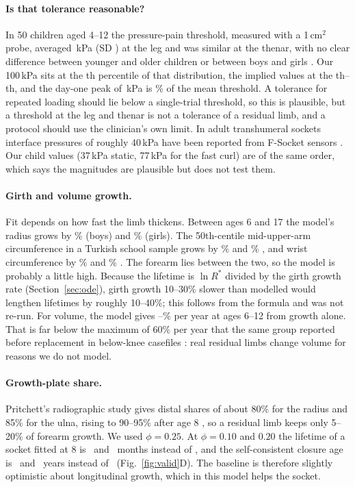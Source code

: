 \documentclass[11pt]{article}
\begin{document}
\paragraph{Is that tolerance reasonable?} In 50 children aged 4--12 the pressure-pain threshold, measured with a 1\,cm$^2$ probe, averaged \pptMean\,kPa (SD \pptSd) at the leg and was similar at the thenar, with no clear difference between younger and older children or between boys and girls \citep{nikolajsen2011}. Our 100\,kPa sits at the \tolPct th percentile of that distribution, the implied values at the \impPctCyl th--\impPctTap th, and the day-one peak of \pZeroEight\,kPa is \dayOnePPT\% of the mean threshold. A tolerance for repeated loading should lie below a single-trial threshold, so this is plausible, but a threshold at the leg and thenar is not a tolerance of a residual limb, and a protocol should use the clinician's own limit. In adult transhumeral sockets interface pressures of roughly 40\,kPa have been reported from F-Socket sensors \citep{razak2014}. Our child values (37\,kPa static, 77\,kPa for the fast curl) are of the same order, which says the magnitudes are plausible but does not test them.

\paragraph{Girth and volume growth.} Fit depends on how fast the limb thickens. Between ages 6 and 17 the model's radius grows by \girthBoyModel\% (boys) and \girthGirlModel\% (girls). The 50th-centile mid-upper-arm circumference in a Turkish school sample grows by \girthBoyMuac\% and \girthGirlMuac\% \citep{ozturk2009}, and wrist circumference by \girthBoyWrist\% and \girthGirlWrist\% \citep{ozturk2017}. The forearm lies between the two, so the model is probably a little high. Because the lifetime is $\ln R^*$ divided by the girth growth rate (Section~\ref{sec:ode}), girth growth 10--30\% slower than modelled would lengthen lifetimes by roughly 10--40\%; this follows from the formula and was not re-run. For volume, the model gives \volSix--\volTwelve\% per year at ages 6--12 from growth alone. That is far below the maximum of 60\% per year that the same group reported before replacement in below-knee casefiles \citep{ghidini2025poster}: real residual limbs change volume for reasons we do not model.

\paragraph{Growth-plate share.} Pritchett's radiographic study gives distal shares of about 80\% for the radius and 85\% for the ulna, rising to 90--95\% after age 8 \citep{pritchett1991}, so a residual limb keeps only 5--20\% of forearm growth. We used $\phi=0.25$. At $\phi=0.10$ and $0.20$ the lifetime of a socket fitted at 8 is \phiLifeLow\ and \phiLifeMid\ months instead of \lifeCyl, and the self-consistent closure age is \phiCloLow\ and \phiCloMid\ years instead of \sensLimbSixBoy\ (Fig.~\ref{fig:valid}D). The baseline is therefore slightly optimistic about longitudinal growth, which in this model helps the socket.
\end{document}
